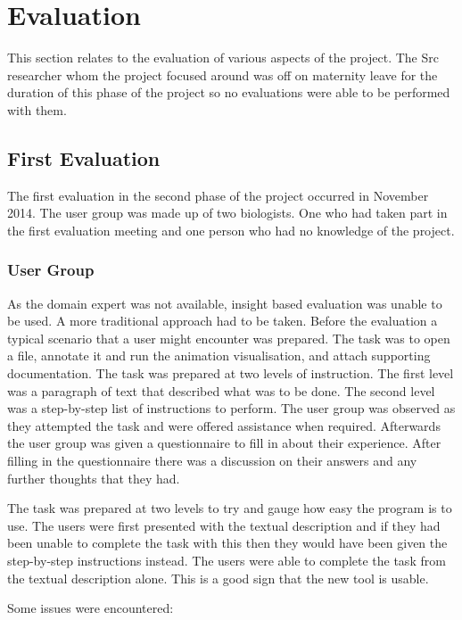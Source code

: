 \chapter{Evaluation}
\label{chap:eval}

This section relates to the evaluation of various aspects of the project.  The Src researcher whom the project focused around was off on maternity leave for the duration of this phase of the project so no evaluations were able to be performed with them.

\section{First Evaluation}

The first evaluation in the second phase of the project occurred in November 2014.  The user group was made up of two biologists.  One who had taken part in the first evaluation meeting and one person who had no knowledge of the project.

\subsection{User Group}

As the domain expert was not available, insight based evaluation was unable to be used.  A more traditional approach had to be taken.  Before the evaluation  a typical scenario that a user might encounter was prepared.  The task was to open a file, annotate it and run the animation visualisation, and attach supporting documentation.  The task was prepared at two levels of instruction.  The first level was a paragraph of text that described what was to be done.  The second level was a step-by-step list of instructions to perform.  The user group was observed as they attempted the task and were offered assistance when required.  Afterwards the user group was given a questionnaire to fill in about their experience. After filling in the questionnaire there was a discussion on their answers and any further thoughts that they had.

The task was prepared at two levels to try and gauge how easy the program is to use.  The users were first presented with the textual description and if they had been unable to complete the task with this then they would have been given the step-by-step instructions instead.  The users were able to complete the task from the textual description alone.  This is a good sign that the new tool is usable.

Some issues were encountered:

